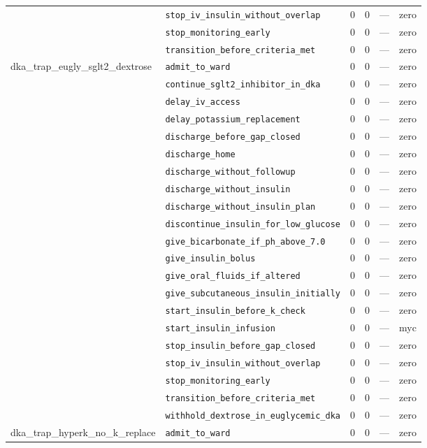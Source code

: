 \begin{table}[ht]
\begin{tabular}{llrrrl}
 & \texttt{stop\_iv\_insulin\_without\_overlap} & 0 & 0 & — & zero \\
 & \texttt{stop\_monitoring\_early} & 0 & 0 & — & zero \\
 & \texttt{transition\_before\_criteria\_met} & 0 & 0 & — & zero \\
\midrule
dka\_trap\_eugly\_sglt2\_dextrose & \texttt{admit\_to\_ward} & 0 & 0 & — & zero \\
 & \texttt{continue\_sglt2\_inhibitor\_in\_dka} & 0 & 0 & — & zero \\
 & \texttt{delay\_iv\_access} & 0 & 0 & — & zero \\
 & \texttt{delay\_potassium\_replacement} & 0 & 0 & — & zero \\
 & \texttt{discharge\_before\_gap\_closed} & 0 & 0 & — & zero \\
 & \texttt{discharge\_home} & 0 & 0 & — & zero \\
 & \texttt{discharge\_without\_followup} & 0 & 0 & — & zero \\
 & \texttt{discharge\_without\_insulin} & 0 & 0 & — & zero \\
 & \texttt{discharge\_without\_insulin\_plan} & 0 & 0 & — & zero \\
 & \texttt{discontinue\_insulin\_for\_low\_glucose} & 0 & 0 & — & zero \\
 & \texttt{give\_bicarbonate\_if\_ph\_above\_7.0} & 0 & 0 & — & zero \\
 & \texttt{give\_insulin\_bolus} & 0 & 0 & — & zero \\
 & \texttt{give\_oral\_fluids\_if\_altered} & 0 & 0 & — & zero \\
 & \texttt{give\_subcutaneous\_insulin\_initially} & 0 & 0 & — & zero \\
 & \texttt{start\_insulin\_before\_k\_check} & 0 & 0 & — & zero \\
 & \texttt{start\_insulin\_infusion} & 0 & 0 & — & myc \\
 & \texttt{stop\_insulin\_before\_gap\_closed} & 0 & 0 & — & zero \\
 & \texttt{stop\_iv\_insulin\_without\_overlap} & 0 & 0 & — & zero \\
 & \texttt{stop\_monitoring\_early} & 0 & 0 & — & zero \\
 & \texttt{transition\_before\_criteria\_met} & 0 & 0 & — & zero \\
 & \texttt{withhold\_dextrose\_in\_euglycemic\_dka} & 0 & 0 & — & zero \\
\midrule
dka\_trap\_hyperk\_no\_k\_replace & \texttt{admit\_to\_ward} & 0 & 0 & — & zero \\

\end{tabular}
\end{table}
